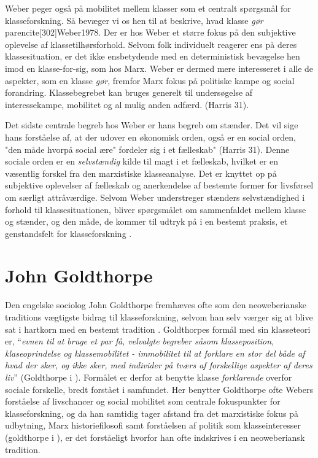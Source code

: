 Weber peger også på mobilitet mellem klasser som et centralt spørgsmål for klasseforskning. Så bevæger vi os hen til at beskrive, hvad klasse \emph{gør} parencite[302]{Weber1978}. Der er hos Weber et større fokus på den subjektive oplevelse af klassetilhørsforhold. Selvom folk individuelt reagerer ens på deres klassesituation, er det ikke ensbetydende med en deterministisk bevægelse hen imod en klasse-for-sig, som hos Marx. Weber er dermed mere interesseret i alle de aspekter, som en klasse \emph{gør}, fremfor Marx fokus på politiske kampe og social forandring. Klassebegrebet kan bruges generelt til undersøgelse af interessekampe, mobilitet og al mulig anden adfærd. (Harris 31). %

Det sidste centrale begreb hos Weber er hans begreb om stænder. Det vil sige hans forståelse af, at der udover en økonomisk orden, også er en social orden, "den måde hvorpå social ære" fordeler sig i et fælleskab" (Harris 31). Denne sociale orden er en \emph{selvstændig} kilde til magt i et fælleskab, hvilket er en væsentlig forskel fra den marxistiske klasseanalyse. Det er knyttet op på subjektive oplevelser af fælleskab og anerkendelse af bestemte former for livsførsel om særligt attråværdige. Selvom Weber understreger stænders selvstændighed i forhold til klassesituationen, bliver spørgsmålet om sammenfaldet mellem klasse og stænder, og den måde, de kommer til udtryk på i en bestemt praksis, et genstandsfelt for klasseforskning \parencite[32]{Harrits2014}.


\section{John Goldthorpe \label{2_goldthorpe}}

Den engelske sociolog John Goldthorpe fremhæves ofte som den neoweberianske traditions vægtigste bidrag til klasseforskning, selvom han selv værger sig at blive sat i hartkorn med en bestemt tradition \parencite[90]{Harrits2014}. Goldthorpes formål med sin klasseteori er, “\emph{evnen til at bruge et par få, velvalgte begreber såsom klasseposition, klaseoprindelse og klassemobilitet - immobilitet til at forklare en stor del både af hvad der sker, og ikke sker, med individer på tværs af forskellige aspekter af deres liv}” (Goldthorpe i \parencite[90]{Harrits2014}). Formålet er derfor at benytte klasse \emph{forklarende} overfor sociale forskelle, bredt forstået i samfundet. Her benytter Goldthorpe ofte Webers forståelse af livschancer og social mobilitet som centrale fokuspunkter for klasseforskning, og da han samtidig tager afstand fra det marxistiske fokus på udbytning, Marx historiefilosofi samt forståelsen af politik som klasseinteresser (goldthorpe i \parencite[90]{Harrits2014}), er det forståeligt hvorfor han ofte indskrives i en neoweberiansk tradition. %

